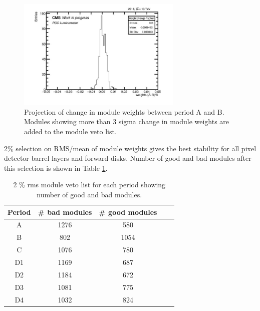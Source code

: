 \begin{figure}[!htp]
\centering
\includegraphics[width=0.7\textwidth]{ashish_thesis/mod_weight_comp_2.png}
\caption[Module weights change removal]{%
   Projection of change in module weights between period A and B. Modules showing more than 3 sigma change in module weights are added to the module veto list.
}
\label{fig:mod_w_com_1}
\end{figure}
   
 2\% selection on RMS/mean of module weights gives the best stability for all pixel detector barrel layers and forward disks. Number of good and bad modules after this selection is shown in Table \ref{tab:per period veto}. %
                                                                                 
 \begin{table}
   \begin{center}
     \caption[Good/bad modules for each period]{2 \% rms module veto list for each period showing number of good and bad modules.}
    \begin{tabular}{ccccc}  
    \textbf{Period}   & \textbf{\# bad modules} & \textbf{\# good modules} \\ \hline
     A      &   1276   &  580    \\  
     B      &    802  &     1054  \\ 
     C      &   1076  &    780   \\ 
     D1     &  1169  &     687  \\ 
     D2     &  1184  &    672   \\ 
     D3     &  1081  &    775   \\ 
     D4     &  1032  &     824  \\ 
      \end{tabular}
    \label{tab:per period veto}
  \end{center}
\end{table}


